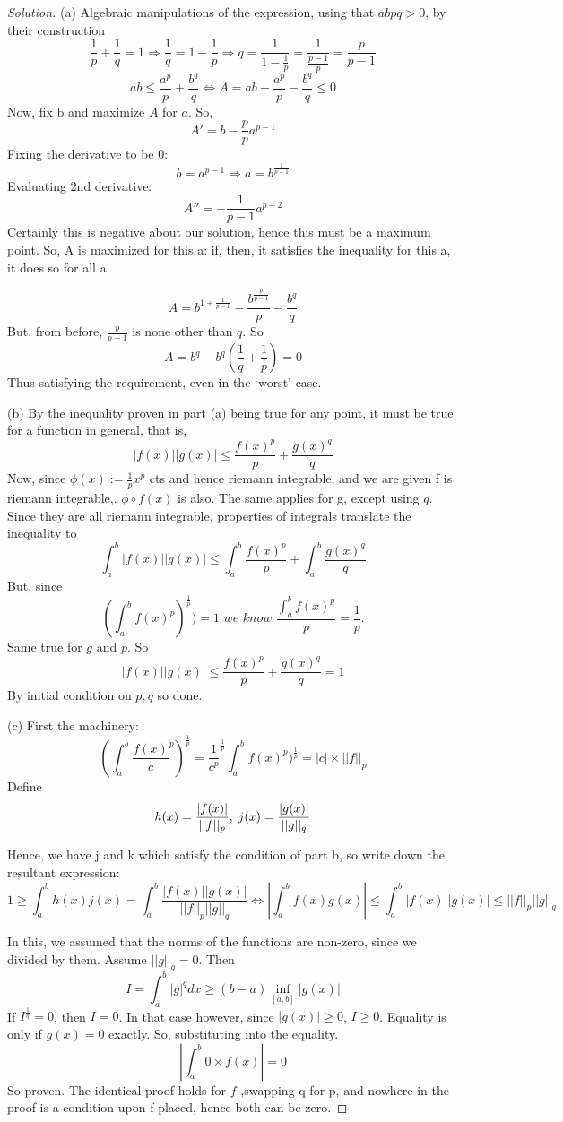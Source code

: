 \documentclass{article}
\newenvironment{problem}[2][Problem]{\begin{trivlist}
\item[\hskip \labelsep {\bfseries #1}\hskip \labelsep {\bfseries #2.}]}{\end{trivlist}}
\newenvironment{solution}{\begin{proof}[Solution]}{\end{proof}}
\begin{document}
\begin{solution}
(a)
	Algebraic manipulations of the expression, using that $abpq>0$, by their construction
	\[
	\frac{1}{p}+\frac{1}{q} = 1 \Rightarrow \frac{1}{q} = 1 - \frac{1}{p} \Rightarrow q = \frac{1}{1-\frac{1}{p}} = \frac{1}{\frac{p-1}{p}} = \frac{p}{p-1}
\]
\[
	ab \leq \frac{a^{p}}{p}+\frac{b^{q}}{q} \iff A = ab - \frac{a^{p}}{p}-\frac{b^{q}}{q}  \leq 0 
\]
Now, fix b and maximize $A$ for $a$. So, \[
	A' = b - \frac{p}{p}a^{p-1}
\]
Fixing the derivative to be 0: 
\[
	b = a^{p-1} \Rightarrow a = b^{\frac{1}{p-1}}
\]
Evaluating 2nd derivative:
\[
	A'' = -\frac{1}{p-1}a^{p-2}
\]
Certainly this is negative about our solution, hence this must be a maximum point. So, A is maximized for this a: if, then, it satisfies the inequality for this a, it does so for all a.

\[
	A = b^{1+\frac{1}{p-1}} - \frac{b^{\frac{p}{p-1}}}{p} - \frac{b^q}{q} 
\]
But, from before, $\frac{p}{p-1}$ is none other than $q$. So
\[
	A = b^q - b^{q}(\frac{1}{q}+\frac{1}{p}) = 0
\]
Thus satisfying the requirement, even in the `worst' case.

(b)
By the inequality proven in part (a) being true for any point, it must be true for a function in general, that is, \[
	|f(x)||g(x)| \leq \frac{f(x)^{p}}{p} + \frac{g(x)^{q}}{q}
\]
Now, since $\phi (x) := \frac{1}{p}x^{p}$ cts and hence riemann integrable, and we are given f is riemann integrable,. $\phi \circ f(x)$ is also. The same applies for g, except using $q$. Since they are all riemann integrable, properties of integrals translate the inequality to \[
	\int_{a}^{b}|f(x)||g(x)| \leq \int_{a}^{b} \frac{f(x)^{p}}{p} + \int_{a}^{b} \frac{g(x)^{q}}{q} 
\]
But, since \[
	(\int_{a}^{b}f(x)^{p})^{\frac{1}{p}}) = 1 \textit{ we know } \frac{\int_{a}^{b}f(x)^{p}}{p} = \frac{1}{p}. 
\]
Same true for $g$ and $p$.
So 
\[
		|f(x)||g(x)| \leq \frac{f(x)^{p}}{p} + \frac{g(x)^{q}}{q} = 1
\]
By initial condition on $p, q $ so done.

(c)
First the machinery:
\[
	(\int_{a}^{b}\frac{f(x)}{c}^{p})^{\frac{1}{p}} =\frac{1}{c^p}^{\frac{1}{p}}\int_{a}^{b}f(x)^{p})^{\frac{1}{p}} = |c|\times ||f||_{p}    
\]
Define 
\[
	h(x) = \frac{|f(x)|}{||f||_{p}}, \hspace{1mm} j(x) = \frac{|g(x)|}{||g||_{q}}
\]

Hence, we have j and k which satisfy the condition of part b, so write down the resultant expression:
\[
	1 \geq \int_{a}^{b}h(x)j(x) = \int_{a}^{b}\frac{|f(x)||g(x)|}{||f||_{p}||g||_{q}} \iff  |\int_{a}^{b}f(x)g(x)|\leq \int_{a}^{b}|f(x)||g(x)| \leq ||f||_{p}||g||_{q} 
\]

In this, we assumed that the norms of the functions are non-zero, since we divided by them. Assume $||g||_{q} = 0$. Then \[
	I = \int_{a}^{b}|g|^{q}dx \geq (b-a)\inf_{[a,b]}|g(x)|
\]
If $I^{\frac{1}{q}} = 0$, then $I = 0$. In that case however, since $|g(x)| \geq 0$, $I\geq 0$. Equality is only if $g(x) = 0$ exactly. So, substituting into the equality.
\[
	|\int_{a}^{b} 0\times f(x)| = 0
\]
So proven. The identical proof holds for $f$ ,swapping q for p, and nowhere in the proof is a condition upon f placed, hence both can be zero.
\end{solution}
\newpage
\begin{problem}{3}
\end{problem}
\end{document}
